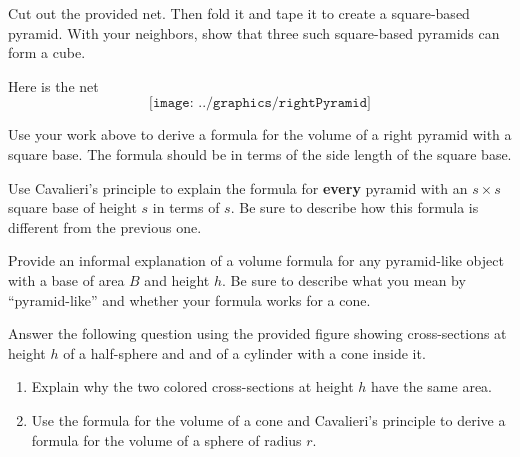 
\begin{prob}
Cut out the provided net.  Then fold it and tape it to create a square-based pyramid.  With your neighbors, show that three such square-based pyramids can form a cube.  
\end{prob}
\begin{teachingnote}
Here is the net
$$\texttt{[image: ../graphics/rightPyramid]}$$
\end{teachingnote}

\begin{prob}
Use your work above to derive a formula for the volume of a
right pyramid with a square base. The formula should be in terms of
the side length of the square base.
\end{prob}

\begin{prob}
Use Cavalieri's principle to explain the formula for \textbf{every} pyramid with an $s\times s$ square base of height $s$ in terms of $s$.  Be sure to describe how this formula is different from the previous one.  
\end{prob}

\begin{prob}
Provide an informal explanation of a volume formula for any pyramid-like object with a base of area $B$ and height $h$.  Be sure to describe what you mean by ``pyramid-like'' and whether your formula works for a cone.  
\end{prob}


\begin{prob}
Answer the following question using the provided figure showing cross-sections at height $h$ of a half-sphere and and of a cylinder with a cone inside it.  
\begin{enumerate}
\item Explain why the two colored cross-sections at height $h$ have the same area. 
\item Use the formula for the volume of a cone and Cavalieri's principle to derive a formula for the volume of a sphere of radius $r$.  
\end{enumerate}
\end{prob}


